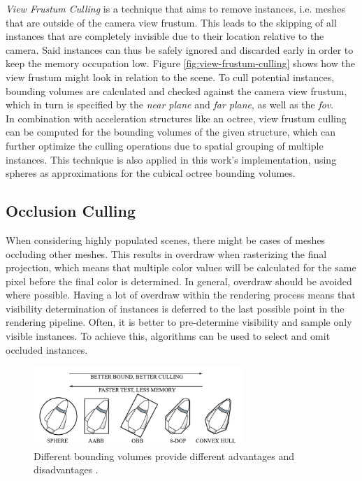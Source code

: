 \noindent
\emph{View Frustum Culling} is a technique that aims to remove instances, i.e. meshes that are outside of the camera 
view frustum. This leads to the skipping of all instances that are completely invisible due to their location relative to 
the camera. Said instances can thus be safely ignored and discarded early in order to keep the memory occupation low. 
Figure \ref{fig:view-frustum-culling} shows how the view frustum might look in relation to the scene. 
To cull potential instances, bounding volumes are calculated and checked against the camera view frustum, which in turn 
is specified by the \emph{near plane} and \emph{far plane}, as well as the \emph{fov}. \\

\noindent
In combination with acceleration structures like an octree, view frustum culling can be computed for the bounding 
volumes of the given structure, which can further optimize the culling operations due to spatial grouping of multiple 
instances. This technique is also applied in this work's implementation, using spheres as approximations for the 
cubical octree bounding volumes.


\subsection*{Occlusion Culling} \label{subsec-point-based-occlusion-culling}

When considering highly populated scenes, there might be cases of meshes occluding other meshes. This results 
in overdraw when rasterizing the final projection, which means that multiple color values will be calculated 
for the same pixel before the final color is determined. In general, overdraw should be avoided where possible. 
Having a lot of overdraw within the rendering process means that visibility determination of instances is deferred 
to the last possible point in the rendering pipeline. Often, it is better to pre-determine visibility and sample 
only visible instances. To achieve this, algorithms can be used to select and omit occluded instances. \\

\begin{figure}[h]
    \centering
    \includegraphics[width=300px]{images/graphics/bounding-volume-quality.jpg}
    \caption{Different bounding volumes provide different advantages and disadvantages \cite{Six2021}.}
    \label{fig:bounding-volumes}
\end{figure}

